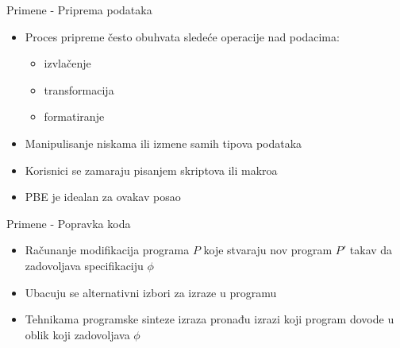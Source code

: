 \documentclass{beamer}
\begin{document}
\begin{frame}{Primene - Priprema podataka}
    \begin{itemize}
        \item Proces pripreme često obuhvata sledeće operacije nad podacima:
            \begin{itemize}
                \item izvlačenje
                \item transformacija
                \item formatiranje
            \end{itemize}
        \item Manipulisanje niskama ili izmene samih tipova podataka
        \item Korisnici se zamaraju pisanjem skriptova ili makroa
        \item PBE je idealan za ovakav posao
    \end{itemize}
\end{frame}

\begin{frame}{Primene - Popravka koda}
    \begin{itemize}
        \item Računanje modifikacija programa $P$ koje stvaraju nov program $P'$ takav da zadovoljava specifikaciju $\phi$
        \item Ubacuju se alternativni izbori za izraze u programu
        \item Tehnikama programske sinteze izraza pronađu izrazi koji program dovode u oblik koji zadovoljava $\phi$
    \end{itemize}
\end{frame}
\end{document}
